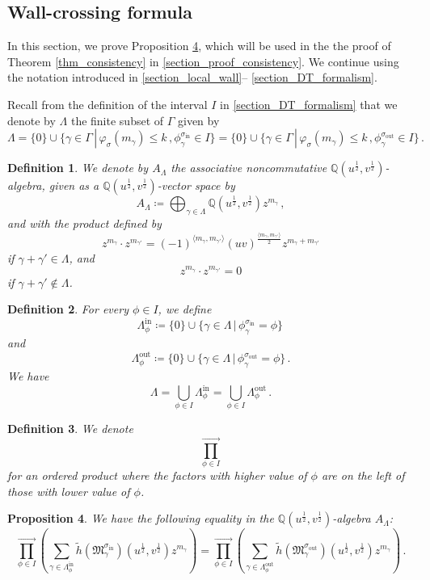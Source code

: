 \documentclass[12pt, a4paper]{amsart}
\newtheorem{defn}{Definition}[section]
\newtheorem{prop}[defn]{Proposition}
\newcommand\Q{\mathbb Q}
\newcommand\fM{\mathfrak M}
\newcommand\iin{\mathrm{in}}
\newcommand\oout{\mathrm{out}}
\begin{document}
\subsection{Wall-crossing formula}
\label{section_wcf}
In this section, we prove Proposition 
\ref{prop_wcf}, which will be used in the the proof of 
Theorem \ref{thm_consistency}
in \cref{section_proof_consistency}.
We continue using the notation introduced in \cref{section_local_wall}-- \cref{section_DT_formalism}.

Recall from the definition of the interval $I$ 
in \cref{section_DT_formalism} that we denote by $\Lambda$ the finite subset of $\Gamma$ given by
\[ \Lambda=\{0\} \cup \{ \gamma \in \Gamma\,|\,
\varphi_\sigma(m_\gamma) \leqslant k\,,
\phi_\gamma^{\sigma_\iin} \in I\}
=\{0\} \cup \{\gamma \in \Gamma \,|\,
\varphi_\sigma(m_\gamma) \leqslant k\,,
\phi_\gamma^{\sigma_\oout} \in I\}\,.\]

\begin{defn}\label{def_algebra_A_Lambda}
We denote by $A_\Lambda$ the associative noncommutative
$\Q(u^{\frac{1}{2}},v^{\frac{1}{2}})$-algebra, given as a $\Q(u^{\frac{1}{2}},
v^{\frac{1}{2}})$-vector space by 
\[ A_\Lambda \coloneq \bigoplus_{\gamma \in \Lambda} 
\Q(u^{\frac{1}{2}},v^{\frac{1}{2}})z^{m_\gamma} \,,\]
and with the product defined by 
\[ z^{m_\gamma} \cdot z^{m_{\gamma'}}= (-1)^{\langle m_\gamma, m_{\gamma'} \rangle} (uv)^{\frac{\langle m_\gamma, m_{\gamma'}\rangle}{2}} z^{m_\gamma+m_{\gamma'}}\]
if $\gamma+\gamma' \in \Lambda$, and 
\[ z^{m_\gamma} \cdot z^{m_{\gamma'}}=0\]
if $\gamma+\gamma' \notin \Lambda$.
\end{defn}

\begin{defn}
For every $\phi \in I$, we define 
\[ \Lambda_\phi^\iin \coloneq 
\{0\} \cup \{ \gamma \in \Lambda \,|\, 
\phi_\gamma^{\sigma_\iin}=\phi\}\,\]
and 
\[ \Lambda_\phi^\oout \coloneq 
\{0\} \cup \{ \gamma \in \Lambda \,|\, 
\phi_\gamma^{\sigma_\oout}=\phi\}\,.\]
We have 
\[ \Lambda=\bigcup_{\phi \in I} \Lambda_\phi^\iin=\bigcup_{\phi \in I} \Lambda_\phi^\oout\,.\]
\end{defn}

\begin{defn}
We denote 
\[\prod_{\phi \in I}^{\rightarrow}\]
for an ordered product where the factors
with higher value of $\phi$ are on the left of those with lower value of $\phi$.
\end{defn}

\begin{prop} \label{prop_wcf}
We have the following equality in 
the $\Q(u^{\frac{1}{2}},v^{\frac{1}{2}})$-algebra $A_\Lambda$:
\[
\prod_{\phi \in I}^{\rightarrow} 
\left(
\sum_{\gamma \in \Lambda_\phi^\iin}
\tilde{h}(\fM_\gamma^{\sigma_{\iin}})(u^{\frac{1}{2}},
v^{\frac{1}{2}})
z^{m_\gamma}
\right)
= 
\prod_{\phi \in I}^{\rightarrow} 
\left(
\sum_{\gamma \in \Lambda_\phi^{\oout}}
\tilde{h}(\fM_\gamma^{\sigma_{\oout}})(u^{\frac{1}{2}},
v^{\frac{1}{2}})
z^{m_\gamma}
\right)\,.\]
\end{prop}
\end{document}

